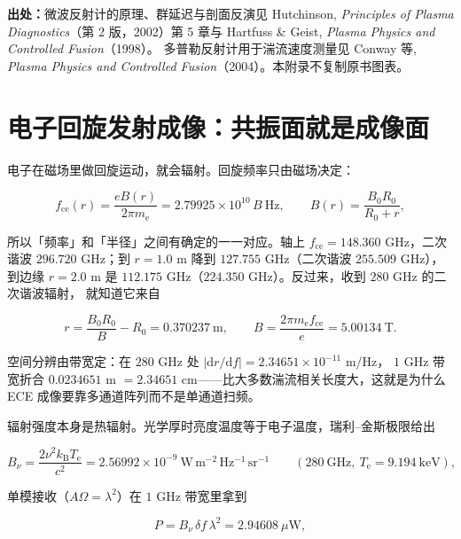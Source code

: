 {\footnotesize
\textbf{出处：}微波反射计的原理、群延迟与剖面反演见 Hutchinson, \emph{Principles of
Plasma Diagnostics}（第 2 版，2002）第 5 章与 Hartfuss \& Geist, \emph{Plasma Physics
and Controlled Fusion}（1998）。
多普勒反射计用于湍流速度测量见 Conway 等,
\emph{Plasma Physics and Controlled Fusion}（2004）。本附录不复制原书图表。
}


\section{电子回旋发射成像：共振面就是成像面}
\label{sec:app-as-ece}

电子在磁场里做回旋运动，就会辐射。回旋频率只由磁场决定：

\begin{equation}
f_\mathrm{ce}(r)=\frac{eB(r)}{2\pi m_\mathrm{e}}=2.79925\times10^{10}\,B\ \mathrm{Hz},
\qquad
B(r)=\frac{B_0R_0}{R_0+r},
\label{eq:app-as-ecefreq}
\end{equation}

所以「频率」和「半径」之间有确定的一一对应。轴上 $f_\mathrm{ce}=148.360$ GHz，二次谐波
$296.720$ GHz；到 $r=1.0$ m 降到 $127.755$ GHz（二次谐波 $255.509$ GHz），到边缘
$r=2.0$ m 是 $112.175$ GHz（$224.350$ GHz）。反过来，收到 $280$ GHz 的二次谐波辐射，
就知道它来自

\begin{equation}
r=\frac{B_0R_0}{B}-R_0=0.370237\ \mathrm{m},
\qquad
B=\frac{2\pi m_\mathrm{e}f_\mathrm{ce}}{e}=5.00134\ \mathrm{T}.
\label{eq:app-as-mapping}
\end{equation}

空间分辨由带宽定：在 $280$ GHz 处 $|\mathrm{d}r/\mathrm{d}f|=2.34651\times10^{-11}$ m/Hz，
$1$ GHz 带宽折合 $0.0234651$ m $=2.34651$ cm——比大多数湍流相关长度大，这就是为什么
ECE 成像要靠多通道阵列而不是单通道扫频。

辐射强度本身是热辐射。光学厚时亮度温度等于电子温度，瑞利--金斯极限给出

\begin{equation}
B_\nu=\frac{2\nu^2 k_\mathrm{B}T_\mathrm{e}}{c^2}
=2.56992\times10^{-9}\ \mathrm{W\,m^{-2}\,Hz^{-1}\,sr^{-1}}
\qquad (280\ \mathrm{GHz},\ T_\mathrm{e}=9.194\ \mathrm{keV}),
\label{eq:app-as-rj}
\end{equation}

单模接收（$A\Omega=\lambda^2$）在 $1$ GHz 带宽里拿到

\begin{equation}
P=B_\nu\,\delta f\,\lambda^2=2.94608\ \mu\mathrm{W},
\label{eq:app-as-ecepow}
\end{equation}

